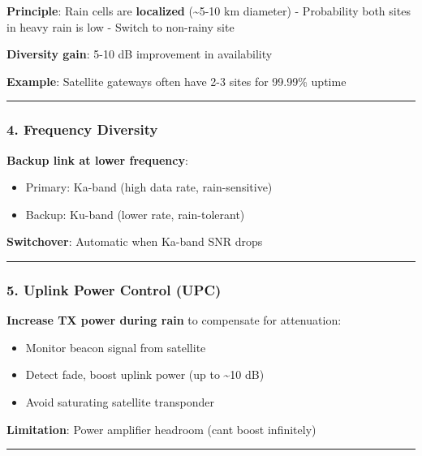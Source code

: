 \textbf{Principle}: Rain cells are \textbf{localized}
(\textasciitilde5-10 km diameter) - Probability both sites in heavy rain
is low - Switch to non-rainy site

\textbf{Diversity gain}: 5-10 dB improvement in availability

\textbf{Example}: Satellite gateways often have 2-3 sites for 99.99\%
uptime

\begin{center}\rule{0.5\linewidth}{0.5pt}\end{center}

\subsubsection{4. Frequency Diversity}\label{frequency-diversity}

\textbf{Backup link at lower frequency}:

\begin{itemize}
\tightlist
\item
  Primary: Ka-band (high data rate, rain-sensitive)
\item
  Backup: Ku-band (lower rate, rain-tolerant)
\end{itemize}

\textbf{Switchover}: Automatic when Ka-band SNR drops

\begin{center}\rule{0.5\linewidth}{0.5pt}\end{center}

\subsubsection{5. Uplink Power Control
(UPC)}\label{uplink-power-control-upc}

\textbf{Increase TX power during rain} to compensate for attenuation:

\begin{itemize}
\tightlist
\item
  Monitor beacon signal from satellite
\item
  Detect fade, boost uplink power (up to \textasciitilde10 dB)
\item
  Avoid saturating satellite transponder
\end{itemize}

\textbf{Limitation}: Power amplifier headroom (can\textquotesingle t
boost infinitely)

\begin{center}\rule{0.5\linewidth}{0.5pt}\end{center}

